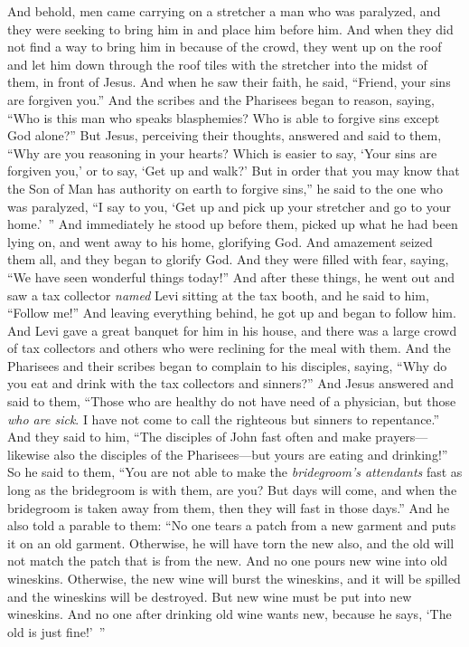 \begin{biblechapter}
\verse And behold, men came carrying on a stretcher a man who was paralyzed, and they were seeking to bring him in and place him﻿ before him.
\verse And when they did not find a way to bring him in because of the crowd, they went up on the roof and let him down through the roof tiles with the stretcher into the midst of them, in front of Jesus.
\verse And when he saw their faith, he said, “Friend, your sins are forgiven you.”
\verse And the scribes and the Pharisees began to reason, saying, “Who is this man who speaks blasphemies? Who is able to forgive sins except God alone?”
\verse But Jesus, perceiving their thoughts, answered and said to them, “Why are you reasoning in your hearts?
\verse Which is easier to say, ‘Your sins are forgiven you,’ or to say, ‘Get up and walk?’
\verse But in order that you may know that the Son of Man has authority on earth to forgive sins,” he said to the one who was paralyzed, “I say to you, ‘Get up and pick up your stretcher and go to your home.’ ”
\verse And immediately he stood up before them, picked up what he had been lying on, and went away to his home, glorifying God.
\verse And amazement seized them all, and they began to glorify God. And they were filled with fear, saying, “We have seen wonderful things today!”
 And after these things, he went out and saw a tax collector \textit{named} Levi sitting at the tax booth, and he said to him, “Follow me!”
\verse And leaving everything behind, he got up and began to follow him.
\verse And Levi gave a great banquet for him in his house, and there was a large crowd of tax collectors and others who were reclining for the meal with them.
\verse And the Pharisees and their scribes began to complain to his disciples, saying, “Why do you eat and drink with the tax collectors and sinners?”
\verse And Jesus answered and said to them, “Those who are healthy do not have need of a physician, but those \textit{who are sick}.
\verse I have not come to call the righteous but sinners to repentance.”
 And they said to him, “The disciples of John fast often and make prayers—likewise also the disciples of the Pharisees—but yours are eating and drinking!”
\verse So he said to them, “You are not able to make the \textit{bridegroom’s attendants} fast as long as the bridegroom is with them, are you?
\verse But days will come, and when the bridegroom is taken away from them, then they will fast in those days.”
\verse And he also told a parable to them: “No one tears a patch from a new garment and puts it on an old garment. Otherwise, he will have torn the new also, and the old will not match the patch that is from the new.
\verse And no one pours new wine into old wineskins. Otherwise, the new wine will burst the wineskins, and it will be spilled and the wineskins will be destroyed.
\verse But new wine must be put into new wineskins.
\verse And no one after drinking old wine wants new, because he says, ‘The old is just fine!’ ”
\end{biblechapter}

